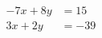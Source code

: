 \documentclass[border=5pt]{standalone}
\begin{document}
$\begin{aligned}
-7x+8y&=15\\3x+2y&=-39
\end{aligned}$
\end{document}
